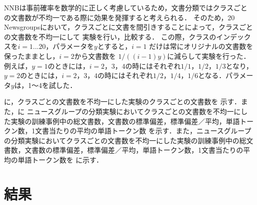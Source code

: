 \documentclass[japanese]{jnlp_1.4}
\newcommand{\tabref}[1]{}
\begin{document}
NNBは事前確率を数学的に正しく考慮しているため，文書分類ではクラスごとの文書数が不均一である際に効果を発揮すると考えられる．
そのため，20 Newsgroupsにおいて，クラスごとに文書を間引きすることによって，クラスごとの文書数を不均一にして
実験を行い，比較する．
この際，クラスのインデックスを$i=1...20$，パラメータを$y$とすると，$i=1$ だけは常にオリジナルの文書数を保ったままとし，$i=2$から文書数を
$1/((i-1)y)$に減らして実験を行った．例えば，$y=1$のときには，$i=2，3，4$の時にはそれぞれ$1/1，1/2，1/3$となり，
$y=2$のときには，$i=2，3，4$の時にはそれぞれ$1/2，1/4，1/6$となる．パラメータ$y$は，1〜4を試した．

\begin{table}[b]
\label{Tab:一文書あたりの単語数を減らした実験のデータ}

\end{table}
\begin{table}[b]
\label{Tab:クラスごとの文書数を不均一にした実験のデータ}

\end{table}

\tabref{Tab:クラスごとの文書数を不均一にした実験のクラスごとの文書数}に，クラスごとの文書数を不均一にした実験のクラスごとの文書数を
示す．また，\tabref{Tab:一文書あたりの単語数を減らした実験のデータ}に
ニュースグループの分類実験においてクラスごとの文書数を不均一にした実験の訓練事例中の総文書数，文書数の標準偏差，標準偏差／平均，単語トークン数，1文書当たりの平均の単語トークン数
を示す．また，ニュースグループの分類実験においてクラスごとの文書数を不均一にした実験の訓練事例中の総文書数，文書数の標準偏差，標準偏差／平均，単語トークン数，1文書当たりの平均の単語トークン数を
\tabref{Tab:クラスごとの文書数を不均一にした実験のデータ}に示す．


\section{結果} \label{Sec:結果}
\end{document}
